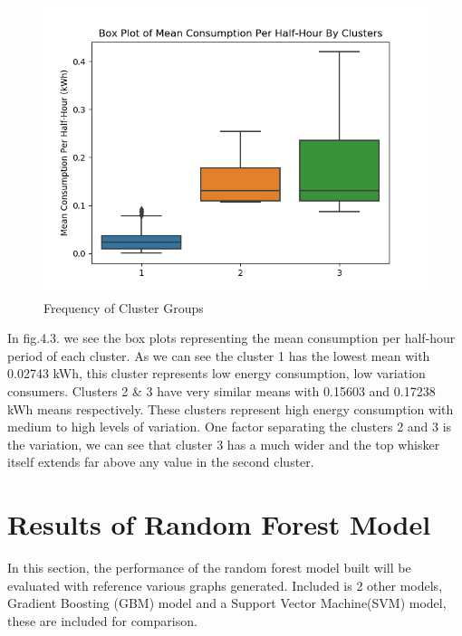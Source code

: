 \begin{figure}[H]
\centering     
\includegraphics[width=1\textwidth]{Figures/results/clusters_boxplot.png}
\caption{Frequency of Cluster Groups}
\label{fig:Dendrogram}
\end{figure} 

In fig.4.3. we see the box plots representing the mean consumption per half-hour period of each cluster. As we can see the cluster 1 has the lowest mean with 0.02743 kWh, this cluster represents low energy consumption, low variation consumers. Clusters 2 \& 3 have very similar means with 0.15603 and 0.17238 kWh means respectively. These clusters represent high energy consumption with medium to high levels of variation. One factor separating the clusters 2 and 3 is the variation, we can see that cluster 3 has a much wider  and the top whisker itself extends far above any value in the second cluster.


\section{Results of Random Forest Model}
In this section, the performance of the random forest model built will be evaluated with reference various graphs generated. Included is 2 other models, Gradient Boosting (GBM) model and a Support Vector Machine(SVM) model, these are included for comparison.

